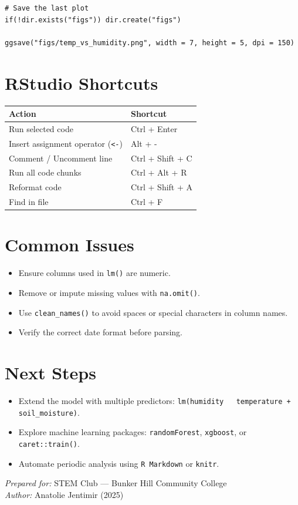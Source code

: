 \documentclass[12pt]{article}
\begin{document}
\begin{lstlisting}
# Save the last plot
if(!dir.exists("figs")) dir.create("figs")

ggsave("figs/temp_vs_humidity.png", width = 7, height = 5, dpi = 150)
\end{lstlisting}

\section{RStudio Shortcuts}
\begin{center}
\begin{tabular}{ll}
\toprule
\textbf{Action} & \textbf{Shortcut} \\
\midrule
Run selected code & Ctrl + Enter \\
Insert assignment operator (\texttt{<-}) & Alt + - \\
Comment / Uncomment line & Ctrl + Shift + C \\
Run all code chunks & Ctrl + Alt + R \\
Reformat code & Ctrl + Shift + A \\
Find in file & Ctrl + F \\
\bottomrule
\end{tabular}
\end{center}

\section{Common Issues}
\begin{itemize}
  \item Ensure columns used in \texttt{lm()} are numeric.
  \item Remove or impute missing values with \texttt{na.omit()}.
  \item Use \texttt{clean\_names()} to avoid spaces or special characters in column names.
  \item Verify the correct date format before parsing.
\end{itemize}

\section{Next Steps}
\begin{itemize}
  \item Extend the model with multiple predictors: \texttt{lm(humidity ~ temperature + soil\_moisture)}.
  \item Explore machine learning packages: \texttt{randomForest}, \texttt{xgboost}, or \texttt{caret::train()}.
  \item Automate periodic analysis using \texttt{R Markdown} or \texttt{knitr}.
\end{itemize}

\vfill
\noindent\textit{Prepared for:} STEM Club — Bunker Hill Community College \\
\textit{Author:} Anatolie Jentimir (2025)
\end{document}
